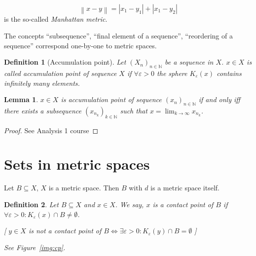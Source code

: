 \documentclass{article}
\newtheorem{definition}{Definition}  \numberwithin{definition}{section}
\newtheorem{lemma}{Lemma}  \numberwithin{lemma}{section}
\newcommand{\norm}[1]{\left\|#1\right\|}
\newcommand{\card}[1]{\left|#1\right|}
\begin{document}
\[ \norm{x - y} = \card{x_1 - y_1} + \card{x_1 - y_2} \]
is the so-called \emph{Manhattan metric}.

The concepts \enquote{subsequence}, \enquote{final element of a sequence}, \enquote{reordering of a sequence} correspond one-by-one to metric spaces.

\begin{definition}[Accumulation point]
  Let $(X_n)_{n\in\mathbb N}$ be a sequence in $X$. $x \in X$ is called \emph{accumulation point of sequence $X$}
  if $\forall \varepsilon > 0$ the sphere $K_{\varepsilon}(x)$ contains infinitely many elements.
\end{definition}

\begin{lemma}
  $x \in X$ is accumulation point of sequence $(x_n)_{n\in\mathbb N}$
  if and only iff there exists a subsequence $(x_{n_k})_{k \in \mathbb N}$ such that
  $x = \lim_{k\to\infty} x_{n_k}$.
\end{lemma}

\begin{proof}
  See Analysis 1 course
\end{proof}

\section{Sets in metric spaces}

Let $B \subseteq X$, $X$ is a metric space. Then $B$ with $d$ is a metric space itself.

\begin{definition}
  Let $B \subseteq X$ and $x \in X$. We say, $x$ is a \emph{contact point of $B$}
  if $\forall \varepsilon > 0: K_{\varepsilon}(x) \cap B \neq \emptyset$.

  [ $y \in X$ is not a contact point of $B \iff \exists \varepsilon > 0: K_{\varepsilon}(y) \cap B = \emptyset$ ]

  See Figure~\ref{img:cp}.
\end{definition}
\end{document}
